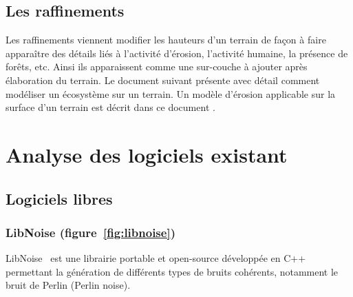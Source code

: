 \subsection{Les raffinements}
Les raffinements viennent modifier les hauteurs d'un terrain de façon à faire apparaître des détails liés à l'activité d'érosion, l'activité humaine, la présence de forêts, etc.
Ainsi ils apparaissent comme une sur-couche à ajouter après élaboration du terrain.\newline
Le document suivant \cite{Deus98} présente avec détail comment modéliser un écosystème sur un terrain. Un modèle d'érosion applicable sur la surface d'un terrain est décrit dans ce document \cite{Kell88}.



\section{Analyse des logiciels existant}
\subsection{Logiciels libres}
\subsubsection{LibNoise (figure~\ref{fig:libnoise})}
\label{ref:libnoise}

LibNoise~\cite{LibNoise} est une librairie portable et open-source développée en C++
permettant la génération de différents types de bruits cohérents, notamment
le bruit de Perlin (Perlin noise).


